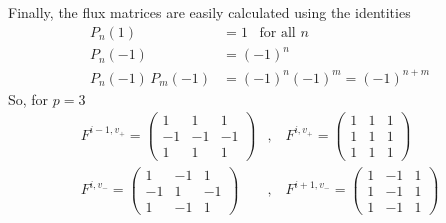\documentclass[10pt,a4paper]{article}
\begin{document}
Finally, the flux matrices are easily calculated using the identities
\begin{align*}
P_n(1) & = 1 \;\;\; \mbox{for all $n$} \\
P_n(-1) & = (-1)^n \\
P_n(-1) \, P_m(-1) & = (-1)^n (-1)^m = (-1)^{n+m}
\end{align*}
So, for $p=3$
\begin{align*}
F^{i-1,v_+} = \left( \begin{array}{rrr}
1 & 1 & 1 \\
-1 & -1 & -1 \\
1 & 1 & 1
\end{array} \right) & , \;\;\;
F^{i,v_+} = \left( \begin{array}{rrr}
1 & 1 & 1 \\
1 & 1 & 1 \\
1 & 1 & 1
\end{array} \right) \\
F^{i,v_-} = \left( \begin{array}{rrr}
1 & -1 & 1 \\
-1 & 1 & -1 \\
1 & -1 & 1
\end{array} \right) & , \;\;\;
F^{i+1,v_-} = \left( \begin{array}{rrr}
1 & -1 & 1 \\
1 & -1 & 1 \\
1 & -1 & 1
\end{array} \right) \\
\end{align*}
\end{document}
